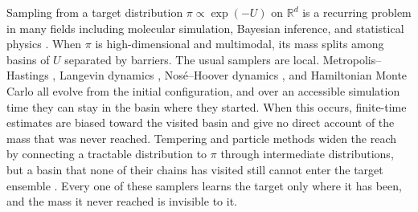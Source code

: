 \documentclass{article}
\begin{document}
Sampling from a target distribution $\pi \propto \exp(-U)$ on $\mathbb R^d$ is a recurring problem in many fields including molecular simulation, Bayesian inference, and statistical physics \citep{frenkel2002understanding,robert2004monte,landau2014guide}. When $\pi$ is high-dimensional and multimodal, its mass splits among basins of $U$ separated by barriers. The usual samplers are local. Metropolis--Hastings \citep{metropolis1953equation,hastings1970monte}, Langevin dynamics \citep{langevin1908theorie,leimkuhler2015molecular}, Nos{\'e}--Hoover dynamics \citep{nose1984unified,hoover1985canonical}, and Hamiltonian Monte Carlo \citep{duane1987hybrid} all evolve from the initial configuration, and over an accessible simulation time they can stay in the basin where they started. When this occurs, finite-time estimates are biased toward the visited basin and give no direct account of the mass that was never reached. Tempering and particle methods widen the reach by connecting a tractable distribution to $\pi$ through intermediate distributions, but a basin that none of their chains has visited still cannot enter the target ensemble \citep{woodard2009conditions,chehab2024provable}. Every one of these samplers learns the target only where it has been, and the mass it never reached is invisible to it.
\end{document}
